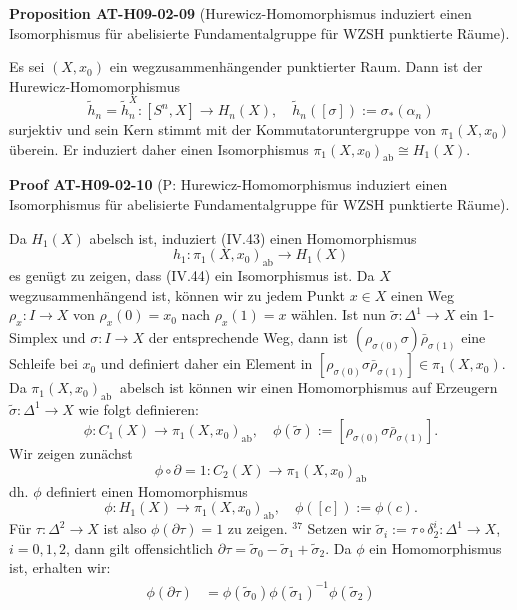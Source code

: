 \documentclass[10pt, letterpaper]{article}
\newcommand{\CustomHeading}[3]{%
  \par\medskip\noindent%
  \textbf{#1 #2} \textnormal{(#3)}.\enskip%
}
\newenvironment{PROP}[2]{\CustomHeading{Proposition}{#1}{#2}}{}
\newenvironment{PROOF}[2]{\CustomHeading{Proof}{#1}{#2}}{}
\begin{document}
\begin{PROP}{AT-H09-02-09}{Hurewicz-Homomorphismus induziert einen Isomorphismus für abelisierte Fundamentalgruppe für WZSH punktierte Räume}
Es sei $(X, x_0)$ ein wegzusammenhängender punktierter Raum. Dann ist der Hurewicz-Homomorphismus 
$$\tilde{h}_n=\tilde{h}_n^X:\left[S^n, X\right] \rightarrow H_n(X), \quad \tilde{h}_n([\sigma]):=\sigma_*\left(\alpha_n\right)$$
surjektiv und sein Kern stimmt mit der Kommutatoruntergruppe von $\pi_1\left(X, x_0\right)$ überein. Er induziert daher einen Isomorphismus $\pi_1\left(X, x_0\right)_{\mathrm{ab}} \cong H_1(X)$.
\end{PROP}

\begin{PROOF}{AT-H09-02-10}{P: Hurewicz-Homomorphismus induziert einen Isomorphismus für abelisierte Fundamentalgruppe für WZSH punktierte Räume}
Da $H_1(X)$ abelsch ist, induziert (IV.43) einen Homomorphismus
$$
h_1: \pi_1\left(X, x_0\right)_{\mathrm{ab}} \rightarrow H_1(X)
$$
es genügt zu zeigen, dass (IV.44) ein Isomorphismus ist. Da $X$ wegzusammenhängend ist, können wir zu jedem Punkt $x \in X$ einen Weg $\rho_x: I \rightarrow X$ von $\rho_x(0)=x_0$ nach $\rho_x(1)=x$ wählen. Ist nun $\tilde{\sigma}: \Delta^1 \rightarrow X$ ein 1-Simplex und $\sigma: I \rightarrow X$ der entsprechende Weg, dann ist $\left(\rho_{\sigma(0)} \sigma\right) \bar{\rho}_{\sigma(1)}$ eine Schleife bei $x_0$ und definiert daher ein Element in $\left[\rho_{\sigma(0)} \sigma \bar{\rho}_{\sigma(1)}\right] \in \pi_1\left(X, x_0\right)$. Da $\pi_1\left(X, x_0\right)_{\text {ab }}$ abelsch ist können wir einen Homomorphismus auf Erzeugern $\tilde{\sigma}: \Delta^1 \rightarrow X$ wie folgt definieren:
$$
\phi: C_1(X) \rightarrow \pi_1\left(X, x_0\right)_{\mathrm{ab}}, \quad \phi(\tilde{\sigma}):=\left[\rho_{\sigma(0)} \sigma \bar{\rho}_{\sigma(1)}\right] .
$$
Wir zeigen zunächst
$$
\phi \circ \partial=1: C_2(X) \rightarrow \pi_1\left(X, x_0\right)_{\mathrm{ab}}
$$
dh. $\phi$ definiert einen Homomorphismus
$$
\phi: H_1(X) \rightarrow \pi_1\left(X, x_0\right)_{\mathrm{ab}}, \quad \phi([c]):=\phi(c) .
$$
Für $\tau: \Delta^2 \rightarrow X$ ist also $\phi(\partial \tau)=1$ zu zeigen. ${ }^{37}$ Setzen wir $\tilde{\sigma}_i:=\tau \circ \delta_2^i: \Delta^1 \rightarrow X$, $i=0,1,2$, dann gilt offensichtlich $\partial \tau=\tilde{\sigma}_0-\tilde{\sigma}_1+\tilde{\sigma}_2$. Da $\phi$ ein Homomorphismus ist, erhalten wir:
$$
\begin{aligned}
\phi(\partial \tau) & =\phi\left(\tilde{\sigma}_0\right) \phi\left(\tilde{\sigma}_1\right)^{-1} \phi\left(\tilde{\sigma}_2\right) \\

\end{aligned}$$
\end{PROOF}
\end{document}
